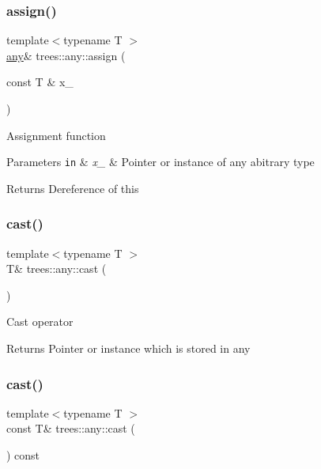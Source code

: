 \subsubsection{\texorpdfstring{assign()}{assign()}\hspace{0.1cm}{\footnotesize\ttfamily [2/2]}}
{\footnotesize\ttfamily template$<$typename T $>$ \\
\hyperlink{classtrees_1_1any}{any}\& trees\+::any\+::assign (\begin{DoxyParamCaption}\item[{const T \&}]{x\+\_\+ }\end{DoxyParamCaption})\hspace{0.3cm}{\ttfamily [inline]}}

Assignment function


\begin{DoxyParams}[1]{Parameters}
\mbox{\tt in}  & {\em x\+\_\+} & Pointer or instance of any abitrary type \\
\hline
\end{DoxyParams}
\begin{DoxyReturn}{Returns}
Dereference of this 
\end{DoxyReturn}
\mbox{\label{classtrees_1_1any_afc8d23b68e666ef86664459a69255cfc}} 
\subsubsection{\texorpdfstring{cast()}{cast()}\hspace{0.1cm}{\footnotesize\ttfamily [1/2]}}
{\footnotesize\ttfamily template$<$typename T $>$ \\
T\& trees\+::any\+::cast (\begin{DoxyParamCaption}{ }\end{DoxyParamCaption})\hspace{0.3cm}{\ttfamily [inline]}}

Cast operator

\begin{DoxyReturn}{Returns}
Pointer or instance which is stored in any 
\end{DoxyReturn}
\mbox{\label{classtrees_1_1any_a63088b3ff9a449b7c5ec82e635aa5b8d}} 
\subsubsection{\texorpdfstring{cast()}{cast()}\hspace{0.1cm}{\footnotesize\ttfamily [2/2]}}
{\footnotesize\ttfamily template$<$typename T $>$ \\
const T\& trees\+::any\+::cast (\begin{DoxyParamCaption}{ }\end{DoxyParamCaption}) const\hspace{0.3cm}{\ttfamily [inline]}}

